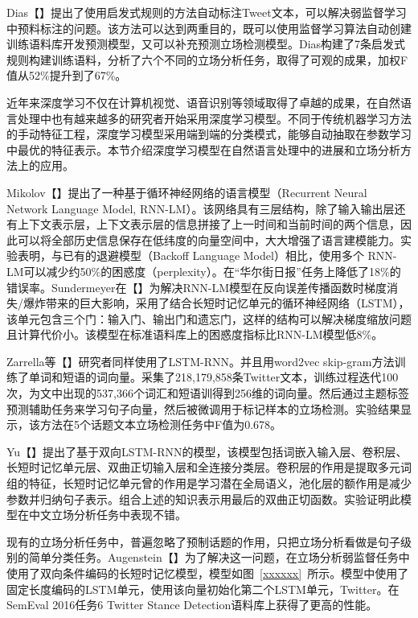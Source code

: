 Dias【】提出了使用启发式规则的方法自动标注Tweet文本，可以解决弱监督学习中预料标注的问题。该方法可以达到两重目的，既可以使用监督学习算法自动创建训练语料库开发预测模型，又可以补充预测立场检测模型。Dias构建了7条启发式规则构建训练语料，分析了六个不同的立场分析任务，取得了可观的成果，加权F值从52\%提升到了67\%。



近年来深度学习不仅在计算机视觉、语音识别等领域取得了卓越的成果，在自然语言处理中也有越来越多的研究者开始采用深度学习模型。不同于传统机器学习方法的手动特征工程，深度学习模型采用端到端的分类模式，能够自动抽取在参数学习中最优的特征表示。本节介绍深度学习模型在自然语言处理中的进展和立场分析方法上的应用。

Mikolov【】提出了一种基于循环神经网络的语言模型（Recurrent Neural Network Language Model, RNN-LM）。该网络具有三层结构，除了输入输出层还有上下文表示层，上下文表示层的信息拼接了上一时间和当前时间的两个信息，因此可以将全部历史信息保存在低纬度的向量空间中，大大增强了语言建模能力。实验表明，与已有的退避模型（Backoff Language Model）相比，使用多个 RNN-LM可以减少约50\%的困惑度（perplexity）。在“华尔街日报”任务上降低了18\%的错误率。Sundermeyer在【】为解决RNN-LM模型在反向误差传播函数时梯度消失/爆炸带来的巨大影响，采用了结合长短时记忆单元的循环神经网络（LSTM），该单元包含三个门：输入门、输出门和遗忘门，这样的结构可以解决梯度缩放问题且计算代价小。该模型在标准语料库上的困惑度指标比RNN-LM模型低8\%。

Zarrella等【】研究者同样使用了LSTM-RNN。并且用word2vec skip-gram方法训练了单词和短语的词向量。采集了218,179,858条Twitter文本，训练过程迭代100次，为文中出现的537,366个词汇和短语训得到256维的词向量。然后通过主题标签预测辅助任务来学习句子向量，然后被微调用于标记样本的立场检测。实验结果显示，该方法在5个话题文本立场检测任务中F值为0.678。

Yu【】提出了基于双向LSTM-RNN的模型，该模型包括词嵌入输入层、卷积层、长短时记忆单元层、双曲正切输入层和全连接分类层。卷积层的作用是提取多元词组的特征，长短时记忆单元曾的作用是学习潜在全局语义，池化层的额作用是减少参数并归纳句子表示。组合上述的知识表示用最后的双曲正切函数。实验证明此模型在中文立场分析任务中表现不错。

现有的立场分析任务中，普遍忽略了预制话题的作用，只把立场分析看做是句子级别的简单分类任务。Augenstein【】为了解决这一问题，在立场分析弱监督任务中使用了双向条件编码的长短时记忆模型，模型如图~\ref{xxxxxx}~所示。模型中使用了固定长度编码的LSTM单元，使用该向量初始化第二个LSTM单元，Twitter。在SemEval 2016任务6 Twitter Stance Detection语料库上获得了更高的性能。

